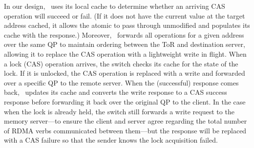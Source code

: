 %



In our design, \sword\ uses its local cache to determine whether an
arriving CAS operation will succeed or fail.  (If it does not have the
current value at the target address cached, it allows the atomic to
pass through unmodified and populates its cache with the response.)
Moreover, \sword\ forwards all operations for a given address over the
same QP to maintain ordering between the ToR and destination server,
allowing it to replace the CAS operation with a lightweight write in
flight.  When a lock (CAS) operation arrives, the switch checks its
cache for the state of the lock. If it is unlocked, the CAS operation
is replaced with a write and forwarded over a specific QP to the
remote server. When the (successful) response comes back,
\sword\ updates its cache and converts the write response to a CAS
success response before forwarding it back over the original QP to the
client. In the case when the lock is already held, the switch still
forwards a write request to the memory server---to ensure the client
and server agree regarding the total number of RDMA verbs communicated
between them---but the response will be replaced with a CAS failure so
that the sender knows the lock acquisition failed.




